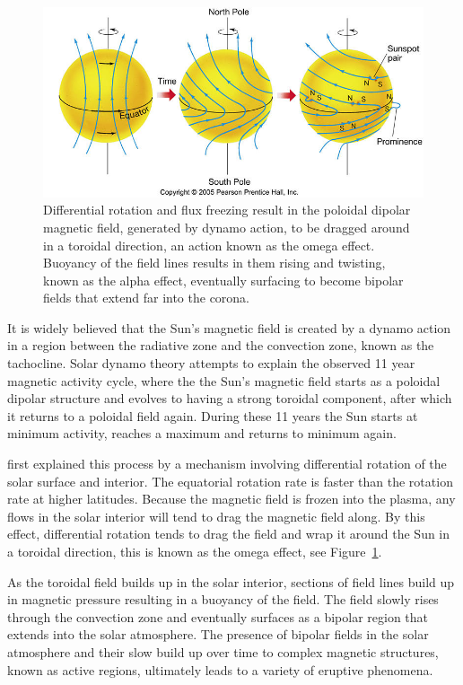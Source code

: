 \begin{figure}[!h]
\begin{center}
\includegraphics[]{images/Babcock}
\caption{Differential rotation and flux freezing result in the poloidal dipolar magnetic field, generated by dynamo action, to be dragged around in a toroidal direction, an action known as the omega effect. Buoyancy of the field lines results in them rising and twisting, known as the alpha effect, eventually surfacing to become bipolar fields that extend far into the corona.}
\label{fig:Babcock} 
\end{center}
\end{figure}

It is widely believed that the Sun's magnetic field is created by a dynamo action in a region between the radiative zone and the convection zone, known as the tachocline. Solar dynamo theory attempts to explain the observed 11 year magnetic activity cycle, where the the Sun's magnetic field starts as a poloidal dipolar structure and evolves to having a strong toroidal component, after which it returns to a poloidal field again. During these 11 years the Sun starts at minimum activity, reaches a maximum and returns to minimum again.

\citet{babcock1961} first explained this process by a mechanism involving differential rotation of the solar surface and interior. The equatorial rotation rate is faster than the rotation rate at higher latitudes. Because the magnetic field is frozen into the plasma, any flows in the solar interior will tend to drag the magnetic field along. By this effect, differential rotation tends to drag the field and wrap it around the Sun in a toroidal direction, this is known as the omega effect, see Figure~\ref{fig:Babcock}.

As the toroidal field builds up in the solar interior, sections of field lines build up in magnetic pressure resulting in a buoyancy of the field. The field slowly rises through the convection zone and eventually surfaces as a bipolar region that extends into the solar atmosphere. The presence of bipolar fields in the solar atmosphere and their slow build up over time to complex magnetic structures, known as active regions, ultimately leads to a variety of eruptive phenomena.



